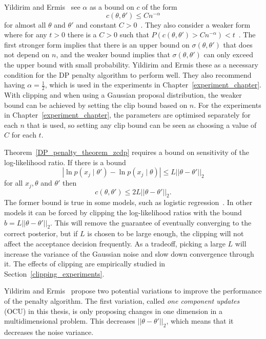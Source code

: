 \documentclass[english,twoside,openright]{HYgraduMLDS}
\begin{document}
Yildirim and Ermis~\cite{YildirimE19} see \(\alpha\) as a bound on \(c\) of the
form
\[
  c(\theta, \theta') \leq Cn^{-\alpha}
\]
for almost all \(\theta\) and \(\theta'\) and constant
\(C > 0\)~\cite[Assumption A1]{YildirimE19}.
They also consider a weaker form where for any \(t > 0\) there is
a \(C > 0\) such that
\(P(c(\theta, \theta') > Cn^{-\alpha}) < t\)~\cite[Assumption A4]{YildirimE19}.
The first stronger form implies that there is an upper bound on
\(\sigma(\theta, \theta')\) that does not depend on \(n\), and the
weaker bound implies that \(\sigma(\theta, \theta')\) can only exceed the
upper bound with small probability. Yildirim and Ermis these as a necessary
condition for the DP penalty algorithm to perform well. They also recommend
having \(\alpha = \frac{1}{2}\), which is used in the experiments in
Chapter~\ref{experiment_chapter}.
With clipping and when using a Gaussian proposal distribution, the weaker bound
can be achieved by setting the clip bound based on \(n\). For the experiments
in Chapter~\ref{experiment_chapter}, the parameters are optimised separately
for each \(n\) that is used, so setting any clip bound can be seen as
choosing a value of \(C\) for each \(t\).

Theorem~\ref{DP_penalty_theorem_zcdp}
requires a bound on sensitivity of the log-likelihood ratio. If there is a bound
\[
    |\ln p(x_j\mid \theta') - \ln p(x_j\mid \theta)| \leq L||\theta - \theta'||_2
\]
for all \(x_j, \theta\) and \(\theta'\) then
\[
    c(\theta, \theta') \leq 2L||\theta - \theta'||_2.
\]
The former bound is true in some models, such as logistic
regression~\cite{YildirimE19}. In other
models it can be forced by clipping the log-likelihood ratios with the bound
\(b = L||\theta - \theta'||_{2}\). This will remove the
guarantee of eventually converging to the correct posterior, but if \(L\) is
chosen to be large enough, the clipping will not affect the
acceptance decision frequently. As a tradeoff, picking a large \(L\) will increase
the variance of the Gaussian noise and slow down convergence through it.
The effects of clipping are empirically studied in
Section~\ref{clipping_experiments}.

Yildirim and Ermis~\cite{YildirimE19} propose two potential variations to improve the
performance of the penalty algorithm. The first variation, called
\emph{one component updates} (OCU) in this thesis, is only proposing
changes in one dimension in a multidimensional problem. This decreases
\(||\theta - \theta'||_2\), which means that it decreases the noise variance.
\end{document}
